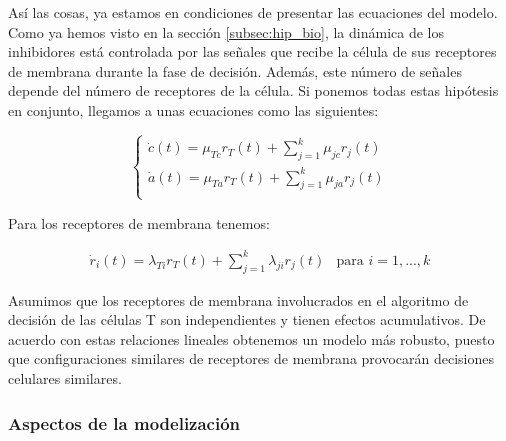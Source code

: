 Así las cosas, ya estamos en condiciones de presentar las ecuaciones del modelo. Como ya hemos visto en la sección \ref{subsec:hip_bio}, la dinámica de los inhibidores está controlada por las señales que recibe la célula de sus receptores de membrana durante la fase de decisión. Además, este número de señales depende del número de receptores de la célula. Si ponemos todas estas hipótesis en conjunto, llegamos a unas ecuaciones como las siguientes:

\begin{equation}
	\label{sist_inhib}
	\left\{ \begin{array}{l}
	\dot{c}(t) = \mu_{Tc}r_{T}(t) + \sum_{j=1}^{k}\mu_{jc}r_{j}(t)\\
	\dot{a}(t) = \mu_{Ta}r_{T}(t) + \sum_{j=1}^{k}\mu_{ja}r_{j}(t) \\
	\end{array}
	\right.
\end{equation}

Para los receptores de membrana tenemos: 

\begin{equation}
	\label{sist_recep}
	\begin{array}{ll}
	\dot{r}_{i}(t) = \lambda_{Ti}r_{T}(t) + \sum_{j=1}^{k}\lambda_{ji}r_{j}(t) & \mbox{para $i=1,...,k$} 
	\end{array}
\end{equation}

Asumimos que los receptores de membrana involucrados en el algoritmo de decisión de las células T son independientes y tienen efectos acumulativos. De acuerdo con estas relaciones lineales obtenemos un modelo más robusto, puesto que configuraciones similares de receptores de membrana provocarán decisiones celulares similares. 

\subsubsection{Aspectos de la modelización}

